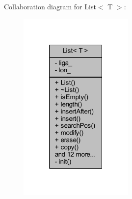 Collaboration diagram for List$<$ T $>$\+:\nopagebreak
\begin{figure}[H]
\begin{center}
\leavevmode
\includegraphics[width=160pt]{dc/de4/class_list__coll__graph}
\end{center}
\end{figure}
